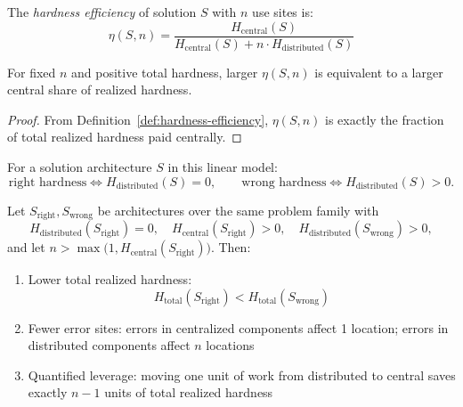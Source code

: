 \begin{definition}\label{def:hardness-efficiency}
The \emph{hardness efficiency} of solution $S$ with $n$ use sites is:
\[\eta(S, n) = \frac{H_{\text{central}}(S)}{H_{\text{central}}(S) + n \cdot H_{\text{distributed}}(S)}\]
\end{definition}

\begin{proposition}\label{prop:hardness-efficiency-interpretation}
For fixed $n$ and positive total hardness, larger $\eta(S,n)$ is equivalent to a larger central share of realized hardness.
\end{proposition}

\begin{proof}
From Definition~\ref{def:hardness-efficiency}, $\eta(S,n)$ is exactly the fraction of total realized hardness paid centrally.
\end{proof}

\begin{definition}\label{def:right-wrong-placement}
For a solution architecture $S$ in this linear model:
\[
\text{right hardness} \iff H_{\mathrm{distributed}}(S)=0,\qquad
\text{wrong hardness} \iff H_{\mathrm{distributed}}(S)>0.
\]
\end{definition}

\begin{theorem}\label{thm:centralization-dominance}
Let $S_{\mathrm{right}}, S_{\mathrm{wrong}}$ be architectures over the same problem family with
\[
H_{\mathrm{distributed}}(S_{\mathrm{right}})=0,\quad
H_{\mathrm{central}}(S_{\mathrm{right}})>0,\quad
H_{\mathrm{distributed}}(S_{\mathrm{wrong}})>0,
\]
and let $n > \max\!\bigl(1, H_{\mathrm{central}}(S_{\mathrm{right}})\bigr)$. Then:
\begin{enumerate}
\item Lower total realized hardness:
\[
H_{\text{total}}(S_{\mathrm{right}}) < H_{\text{total}}(S_{\mathrm{wrong}})
\]
\item Fewer error sites: errors in centralized components affect 1 location; errors in distributed components affect $n$ locations
\item Quantified leverage: moving one unit of work from distributed to central saves exactly $n-1$ units of total realized hardness
\end{enumerate}
\end{theorem}

